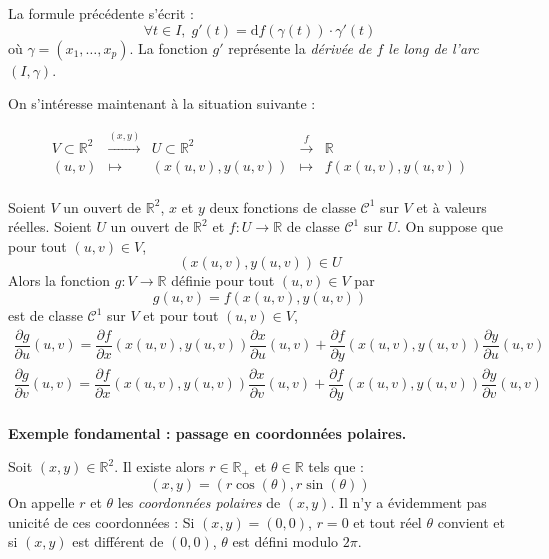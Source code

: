 \documentclass[french,11pt,twoside]{VcCours}
\begin{document}
\begin{Remarque}{} La formule précédente s'écrit :
$$ \forall t \in I, \; g'(t) =\textrm{d}f(\gamma(t)) \cdot \gamma'(t)$$
où $\gamma =(x_1, \ldots, x_p)$. La fonction $g'$ représente la \emph{dérivée de $f$ le long de l'arc} $(I, \gamma)$.
\end{Remarque}

\medskip

On s'intéresse maintenant à la situation suivante : 

$$ \begin{array}{ccccccc}
V \subset \mathbb{R}^2 & \overset{(x,y)}{\rightarrow} & U \subset \mathbb{R}^2 & \overset{f}{\rightarrow} & \mathbb{R} \\
(u,v) & \mapsto & (x(u,v),y(u,v)) & \mapsto & f(x(u,v),y(u,v)) \\
\end{array}$$

\begin{Proposition}{} Soient $V$ un ouvert de $\mathbb{R}^2$, $x$ et $y$ deux fonctions de classe $\mathcal{C}^1$ sur $V$ et à valeurs réelles. Soient $U$ un ouvert de $\mathbb{R}^2$ et $f : U \rightarrow \mathbb{R}$ de classe $\mathcal{C}^1$ sur $U$. On suppose que pour tout $(u,v) \in V$,
$$ (x(u,v),y(u,v)) \in U$$
Alors la fonction $g : V \rightarrow \mathbb{R}$ définie pour tout $(u,v) \in V$ par 
$$ g(u,v) = f(x(u,v),y(u,v))$$
est de classe $\mathcal{C}^1$ sur $V$ et pour tout $(u,v) \in V$,
\begin{align*}
\dfrac{\partial g}{\partial u} (u,v) = \dfrac{\partial f}{\partial x}(x(u,v),y(u,v)) \dfrac{\partial x}{\partial u}(u,v) + \dfrac{\partial f}{\partial y}(x(u,v),y(u,v)) \dfrac{\partial y}{\partial u}(u,v) \\
\dfrac{\partial g}{\partial v} (u,v) = \dfrac{\partial f}{\partial x}(x(u,v),y(u,v)) \dfrac{\partial x}{\partial v}(u,v) + \dfrac{\partial f}{\partial y}(x(u,v),y(u,v)) \dfrac{\partial y}{\partial v}(u,v) \\
\end{align*}
\end{Proposition}

\textbf{Exemple fondamental : passage en coordonnées polaires.}

Soit $(x,y) \in \mathbb{R}^2$. Il existe alors $r \in \mathbb{R}_+$ et $\theta \in \mathbb{R}$ tels que :
$$ (x,y) = (r \cos(\theta), r \sin(\theta))$$
On appelle $r$ et $\theta$ les \emph{coordonnées polaires} de $(x,y)$. Il n'y a évidemment pas unicité de ces coordonnées : Si $(x,y)=(0,0)$, $r=0$ et tout réel $\theta$ convient et si $(x,y)$ est différent de $(0,0)$, $\theta$ est \og défini \fg modulo $2\pi$. 
\end{document}
